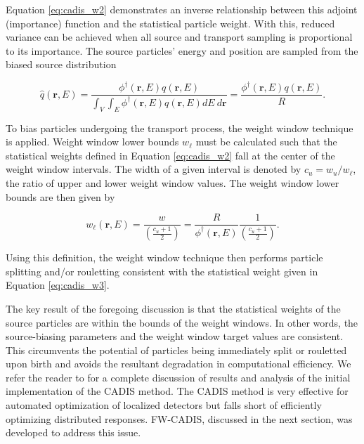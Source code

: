 \documentclass{article} %
\newcommand{\vecr}{\textbf{r}}
\newcommand{\qhat}{\ensuremath{\hat{q}}}
\newcommand{\fwc}{\mbox{FW-CADIS}}
\begin{document}
\noindent Equation \ref{eq:cadis_w2} demonstrates an inverse relationship
between this adjoint (importance) function and the statistical particle weight.
With this, reduced variance can be achieved when all source and transport
sampling is proportional to its importance. The source particles' energy and
position are sampled from the biased source distribution

\begin{equation}
\qhat(\vecr,E) = 
\frac{\phi^{\dagger}(\vecr,E)q(\vecr,E)}
{\int_V\int_E\phi^{\dagger}(\vecr,E)q(\vecr,E) dE\ d\vecr} 
= \frac{\phi^{\dagger}(\vecr,E)q(\vecr,E)}{R}.
\label{eq:cadis_sb}
\end{equation}

To bias particles undergoing the transport process, the weight window technique
is applied. Weight window lower bounds $w_{\ell}$ must be calculated such that
the statistical weights defined in Equation \ref{eq:cadis_w2} fall at the
center of the weight window intervals. The width of a given interval is denoted
by $c_u = w_u/w_{\ell}$, the ratio of upper and lower weight window values. The
weight window lower bounds are then given by

\begin{equation}
w_{\ell}(\vecr,E) = \frac{w}{\left(\frac{c_u +1}{2}\right)} 
= \frac{R}{\phi^{\dagger}(\vecr,E)}\frac{1}{\left(\frac{c_u +1}{2}\right)}.
\label{eq:cadis_tb}
\end{equation}

\noindent Using this definition, the weight window technique then performs
particle splitting and/or rouletting consistent with the statistical weight
given in Equation \ref{eq:cadis_w3}.

The key result of the foregoing discussion is that the statistical weights of
the source particles are within the bounds of the weight windows. In other
words, the source-biasing parameters and the weight window target values are
consistent. This circumvents the potential of particles being immediately split
or rouletted upon birth and avoids the resultant degradation in computational
efficiency. We refer the reader to \cite{cadis} for a complete discussion of
results and analysis of the initial implementation of the CADIS method. The
CADIS method is very effective for automated optimization of localized
detectors but falls short of efficiently optimizing distributed responses.
\fwc, discussed in the next section, was developed to address this issue.

\end{document}
